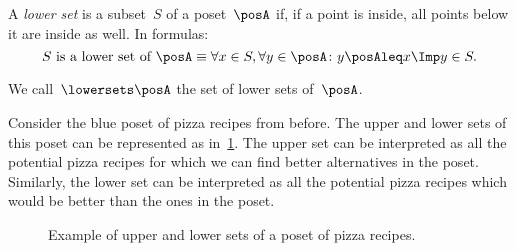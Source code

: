 \begin{definition}
  \label{def:lowerset}
  A \emph{lower set} is a subset~$S$ of a poset~$\posA$ if, if a point is inside, all points below it are inside as well.
  In formulas:
  \begin{equation}
    \text{$S$ is a lower set of $\posA$} \equiv \forall x\in S, \forall y\in \posA \colon y\posAleq x \Imp y\in S.
  \end{equation}
\end{definition}
We call~$\lowersets \posA$ the set of lower sets of~$\posA$.
%

Consider the blue poset of pizza recipes from before. The upper and lower sets of this poset can be represented as in~\cref{fig:upperset}. The upper set can be interpreted as all the potential pizza recipes for which we can find better alternatives in the poset. Similarly, the lower set can be interpreted as all the potential pizza recipes which would be better than the ones in the poset.

\begin{figure}[h!]
  \begin{center}
  \end{center}
  \caption{Example of upper and lower sets of a poset of pizza recipes.}
  \label{fig:upperset}
\end{figure}

%



